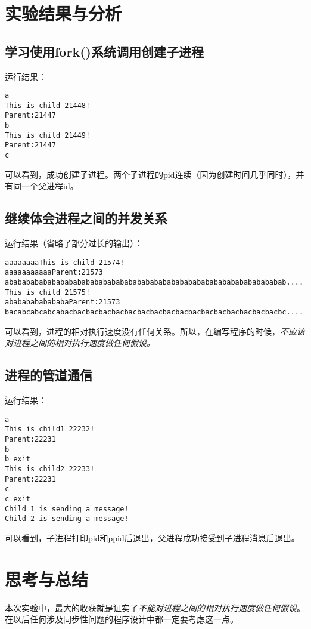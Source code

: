 \documentclass{ctexrep}
\begin{document}
\section{实验结果与分析}

\subsection{学习使用fork()系统调用创建子进程}

运行结果：

\begin{verbatim}
a
This is child 21448!
Parent:21447
b
This is child 21449!
Parent:21447
c
\end{verbatim}

可以看到，成功创建子进程。两个子进程的pid连续（因为创建时间几乎同时），并有同一个父进程id。

\subsection{继续体会进程之间的并发关系}

运行结果（省略了部分过长的输出）：
\begin{verbatim}
aaaaaaaaThis is child 21574!
aaaaaaaaaaaParent:21573
ababababababababababababababababababababababababababababababababab....
This is child 21575!
abababababababaParent:21573
bacabcabcabcabacbacbacbacbacbacbacbacbacbacbacbacbacbacbacbacbacbc....
\end{verbatim}
可以看到，进程的相对执行速度没有任何关系。所以，在编写程序的时候，\emph{不应该对进程之间的相对执行速度做任何假设。}

\subsection{进程的管道通信}

运行结果：
\begin{verbatim}
a
This is child1 22232!
Parent:22231
b
b exit
This is child2 22233!
Parent:22231
c
c exit
Child 1 is sending a message! 
Child 2 is sending a message! 
\end{verbatim}

可以看到，子进程打印pid和ppid后退出，父进程成功接受到子进程消息后退出。

\section{思考与总结}

本次实验中，最大的收获就是证实了\emph{不能对进程之间的相对执行速度做任何假设}。在以后任何涉及同步性问题的程序设计中都一定要考虑这一点。
\end{document}
